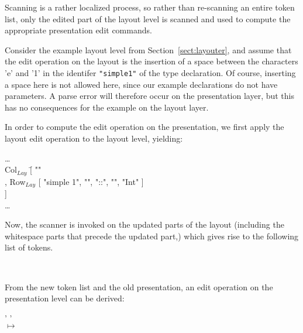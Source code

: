 Scanning is a rather localized process, so rather than re-scanning an entire token list, only the edited part of the layout level is scanned and used to compute the appropriate presentation edit commands. 

Consider the example layout level from Section~\ref{sect:layouter}, and assume that the edit operation on the layout is the insertion of a space between the characters 'e' and '1' in the identifer \verb|"simple1"| of the type declaration. Of course, inserting a space here is not allowed here, since our example declarations do not have parameters. A parse error will therefore occur on the presentation layer, but this has no consequences for the example on the layout layer.

In order to compute the edit operation on the presentation, we first apply the layout edit operation to the layout level, yielding:

\small \ttfamily
\begin{tabbing}
\dots \\
Col$_{Lay}$ \= [ "" \\
                  \> , Row$_{Lay}$ [ "simple 1", "\textvisiblespace", "::", "\textvisiblespace", "Int" ]\\
                  \> ]\\
\dots
\end{tabbing}
\rmfamily \normalsize

Now, the scanner is invoked on the updated parts of the layout (including the whitespace parts that precede the updated part,) which gives rise to the following list of tokens.

\small \ttfamily
\begin{tabbing}
\\
\end{tabbing}
\rmfamily \normalsize
 
From the new token list and the old presentation, an edit operation on the presentation level can be derived:

\small \ttfamily
\begin{tabbing}
 \ttfamily ' ' \\
$\mapsto$\\
 \\  
  
\end{tabbing}
\rmfamily \normalsize

